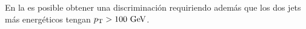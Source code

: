 
En la {\SRL} es posible obtener una discriminación requiriendo además que los dos jets
más energéticos tengan $\pt>100 \gev$.







